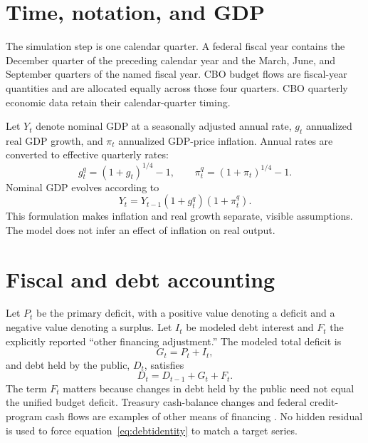 \documentclass[10pt]{article}
\begin{document}
\section{Time, notation, and GDP}

The simulation step is one calendar quarter.  A federal fiscal year contains the December
quarter of the preceding calendar year and the March, June, and September quarters of the
named fiscal year.  CBO budget flows are fiscal-year quantities and are allocated equally
across those four quarters.  CBO quarterly economic data retain their calendar-quarter
timing.

Let $Y_t$ denote nominal GDP at a seasonally adjusted annual rate, $g_t$ annualized real GDP
growth, and $\pi_t$ annualized GDP-price inflation.  Annual rates are converted to effective
quarterly rates:
\begin{equation}
 g^q_t=(1+g_t)^{1/4}-1,
 \qquad
 \pi^q_t=(1+\pi_t)^{1/4}-1.
\end{equation}
Nominal GDP evolves according to
\begin{equation}
 Y_t=Y_{t-1}(1+g^q_t)(1+\pi^q_t).
 \label{eq:gdp}
\end{equation}
This formulation makes inflation and real growth separate, visible assumptions.  The model
does not infer an effect of inflation on real output.

\section{Fiscal and debt accounting}

Let $P_t$ be the primary deficit, with a positive value denoting a deficit and a negative
value denoting a surplus.  Let $I_t$ be modeled debt interest and $F_t$ the explicitly
reported ``other financing adjustment.''  The modeled total deficit is
\begin{equation}
 G_t=P_t+I_t,
 \end{equation}
and debt held by the public, $D_t$, satisfies
\begin{equation}
 D_t=D_{t-1}+G_t+F_t.
 \label{eq:debtidentity}
\end{equation}
The term $F_t$ matters because changes in debt held by the public need not equal the unified
budget deficit.  Treasury cash-balance changes and federal credit-program cash flows are
examples of other means of financing \cite{cbo2026outlook}.  No hidden residual is used to
force equation~\eqref{eq:debtidentity} to match a target series.
\end{document}
